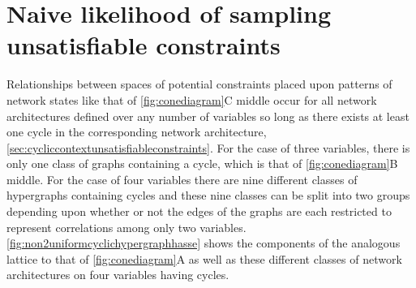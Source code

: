 \section{Naive likelihood of sampling unsatisfiable constraints}\label{sec:volrat}
Relationships between spaces of potential constraints placed upon patterns of network states like that of \autoref{fig:conediagram}C middle occur for all network architectures defined over any number of variables so long as there exists at least one cycle in the corresponding network architecture, \autoref{sec:cycliccontextunsatisfiableconstraints}. For the case of three variables, there is only one class of graphs containing a cycle, which is that of \autoref{fig:conediagram}B middle. For the case of four variables there are nine different classes of hypergraphs containing cycles and these nine classes can be split into two groups depending upon whether or not the edges of the graphs are each restricted to represent correlations among only two variables. \autoref{fig:non2uniformcyclichypergraphhasse} shows the components of the analogous lattice to that of \autoref{fig:conediagram}A as well as these different classes of network architectures on four variables having cycles.


